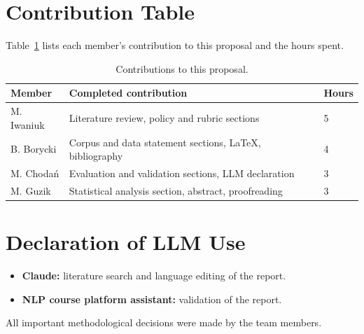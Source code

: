 \documentclass[11pt]{article}
\begin{document}
\section{Contribution Table}
Table~\ref{tab:contributions} lists each member's contribution to this proposal and the hours spent.

\begin{table}[h]
\centering\small
\begin{tabularx}{\columnwidth}{@{}p{}Xp{}@{}}
\toprule
Member & Completed contribution & Hours \\
\midrule
M. Iwaniuk & Literature review, policy and rubric sections & 5 \\
B. Borycki & Corpus and data statement sections, LaTeX, bibliography & 4 \\
M. Chodań & Evaluation and validation sections, LLM declaration & 3 \\
M. Guzik & Statistical analysis section, abstract, proofreading & 3 \\
\bottomrule
\end{tabularx}
\caption{Contributions to this proposal.}
\label{tab:contributions}
\end{table}

\section{Declaration of LLM Use}
\begin{itemize}
\item \textbf{Claude:} literature search and language editing of the report.
\item \textbf{NLP course platform assistant:} validation of the report.
\end{itemize}
All important methodological decisions were made by the team members.



\end{document}
